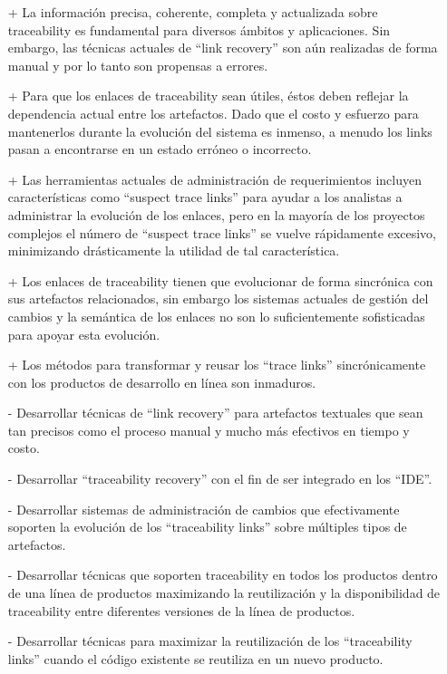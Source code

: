 \documentclass[a4paper,12pt,oneside]{book}
\begin{document}
\begin{itemize}
\item[+]     La información precisa, coherente, completa y actualizada sobre traceability es fundamental para diversos ámbitos y aplicaciones. Sin embargo, las técnicas actuales de “link recovery” son aún realizadas de forma manual y por lo tanto son propensas a errores.
\item[+]    Para que los enlaces de traceability sean útiles, éstos deben reflejar la dependencia actual entre los artefactos. Dado que el costo y esfuerzo para mantenerlos durante la evolución del sistema es inmenso, a menudo los links pasan a encontrarse en un estado erróneo o incorrecto.
 \item[+]   Las herramientas actuales de administración de requerimientos incluyen características como “suspect trace links” para ayudar a los analistas a administrar la evolución de los enlaces, pero en la mayoría de los proyectos complejos el número de “suspect trace links” se vuelve rápidamente excesivo, minimizando drásticamente la utilidad de tal característica.
\item[+]    Los enlaces de traceability tienen que evolucionar de forma sincrónica con sus artefactos relacionados, sin embargo los sistemas actuales de gestión del cambios y la semántica de los enlaces no son lo suficientemente sofisticadas para apoyar esta evolución.
\item[+]    Los métodos para transformar y reusar los “trace links” sincrónicamente con los productos de desarrollo en línea son inmaduros.
\end{itemize}

\begin{itemize}
\item[-]     Desarrollar técnicas de “link recovery” para artefactos textuales que sean tan precisos como el proceso manual y mucho más efectivos en tiempo y costo.
\item[-]    Desarrollar “traceability recovery” con el fin de ser integrado en los ``IDE''.
\item[-]    Desarrollar sistemas de administración de cambios que efectivamente soporten la evolución de los “traceability links” sobre múltiples tipos de artefactos.
\item[-]    Desarrollar técnicas que soporten traceability en todos los productos dentro de una línea de productos maximizando la reutilización y la disponibilidad de traceability entre diferentes versiones de la línea de productos.
\item[-]    Desarrollar técnicas para maximizar la reutilización de los ``traceability links'' cuando el código existente se reutiliza en un nuevo producto.
\end{itemize}
\end{document}
